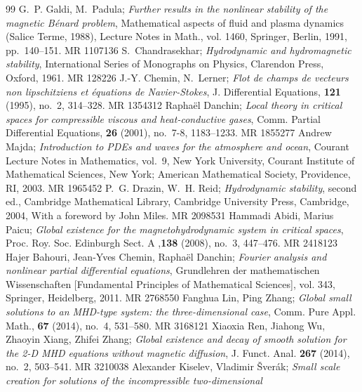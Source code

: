 \documentclass[10pt,a4paper]{amsart}
\numberwithin{equation}{section}
\begin{document}
\begin{thebibliography}{99}
G.~P. Galdi, M.~Padula; 
\emph{Further results in the nonlinear stability of
 the magnetic {B}\'enard problem}, Mathematical aspects of fluid and plasma
 dynamics ({S}alice {T}erme, 1988), Lecture Notes in Math., vol. 1460,
 Springer, Berlin, 1991, pp.~140--151. MR {1107136}
S.~Chandrasekhar; 
\emph{Hydrodynamic and hydromagnetic stability}, International Series
 of Monographs on Physics, Clarendon Press, Oxford, 1961. MR {128226}
J.-Y. Chemin, N.~Lerner; 
\emph{Flot de champs de vecteurs non lipschitziens
 et \'equations de {N}avier-{S}tokes}, J. Differential Equations,
 \textbf{121} (1995), no.~2, 314--328. MR {1354312}
Rapha\"{e}l Danchin; 
\emph{Local theory in critical spaces for compressible
 viscous and heat-conductive gases}, Comm. Partial Differential Equations,
 \textbf{26} (2001), no.~7-8, 1183--1233. MR {1855277}
Andrew Majda; 
\emph{Introduction to {PDE}s and waves for the atmosphere and ocean}, 
Courant Lecture Notes in Mathematics, vol.~9, New York University,
Courant Institute of Mathematical Sciences, New York; American Mathematical
Society, Providence, RI, 2003. MR {1965452}
P.~G. Drazin, W.~H. Reid; 
\emph{Hydrodynamic stability}, second ed.,
 Cambridge Mathematical Library, Cambridge University Press, Cambridge, 2004,
 With a foreword by John Miles. MR {2098531}
Hammadi Abidi, Marius Paicu; 
\emph{Global existence for the
 magnetohydrodynamic system in critical spaces}, Proc. Roy. Soc. Edinburgh
 Sect. A ,\textbf{138} (2008), no.~3, 447--476. MR {2418123}
Hajer Bahouri, Jean-Yves Chemin, Rapha\"{e}l Danchin; 
\emph{Fourier  analysis and nonlinear partial differential equations}, 
Grundlehren der  mathematischen Wissenschaften [Fundamental Principles of Mathematical
 Sciences], vol. 343, Springer, Heidelberg, 2011. MR {2768550}
Fanghua Lin, Ping Zhang; 
\emph{Global small solutions to an {MHD}-type
 system: the three-dimensional case}, Comm. Pure Appl. Math., \textbf{67}
 (2014), no.~4, 531--580. MR {3168121}
Xiaoxia Ren, Jiahong Wu, Zhaoyin Xiang, Zhifei Zhang; 
\emph{Global  existence and decay of smooth solution for the 2-{D} {MHD} equations
 without  magnetic diffusion}, J. Funct. Anal. \textbf{267} (2014), no.~2, 503--541.
 MR {3210038}
Alexander Kiselev, Vladimir \v{S}ver\'{a}k; 
\emph{Small scale creation for  solutions of the incompressible two-dimensional 
}
\end{thebibliography}
\end{document}
